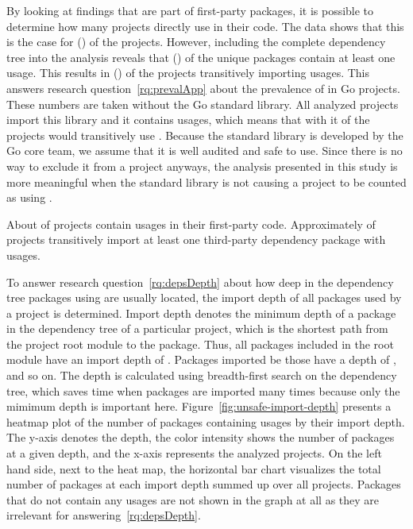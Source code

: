 By looking at \unsafe{} findings that are part of first-party packages, it is possible to determine how many projects
directly use \unsafe{} in their code.
The data shows that this is the case for \unsafeProjects{} (\percentageUnsafeProjects{}) of the \projsAnalyzed{}
projects.
However, including the complete dependency tree into the analysis reveals that \unsafePackages{}
(\percentageUnsafePackages{}) of the \packagesAnalyzed{} unique packages contain at least one \unsafe{} usage.
This results in \unsafeTransitiveWithDependencies{} (\percentageUnsafeTransitiveWithDependencies{}) of the projects
transitively importing \unsafe{} usages.
This answers research question~\ref{rq:prevalApp} about the prevalence of \unsafe{} in Go projects.
These numbers are taken without the Go standard library.
All analyzed projects import this library and it contains \unsafe{} usages, which means that with it
 of the projects would transitively use \unsafe{}.
Because the standard library is developed by the Go core team, we assume that it is well audited and safe to use.
Since there is no way to exclude it from a project anyways, the analysis presented in this study is more meaningful
when the standard library is not causing a project to be counted as using \unsafe{}.

\begin{answerToRQ}[\ref{rq:prevalApp}]
    About \percentageUnsafeProjectsRounded{} of projects contain \unsafe{} usages in their first-party code.
    Approximately \percentageUnsafeTransitiveWithDependenciesRounded{} of projects transitively import at least one
    third-party dependency package with \unsafe{} usages.
\end{answerToRQ}

To answer research question~\ref{rq:depsDepth} about how deep in the dependency tree packages using \unsafe{} are
usually located, the import depth of all packages used by a project is determined.
Import depth denotes the minimum depth of a package in the dependency tree of a particular project, which is the
shortest path from the project root module to the package.
Thus, all packages included in the root module have an import depth of .
Packages imported be those have a depth of , and so on.
The depth is calculated using breadth-first search on the dependency tree, which saves time when packages are imported
many times because only the mimimum depth is important here.
Figure~\ref{fig:unsafe-import-depth} presents a heatmap plot of the number of packages containing \unsafe{} usages by
their import depth.
The y-axis denotes the depth, the color intensity shows the number of \unsafe{} packages at a given depth, and the
x-axis represents the \projsAnalyzed{} analyzed projects.
On the left hand side, next to the heat map, the horizontal bar chart visualizes the total number of packages at each
import depth summed up over all projects.
Packages that do not contain any \unsafe{} usages are not shown in the graph at all as they are irrelevant for
answering~\ref{rq:depsDepth}.

